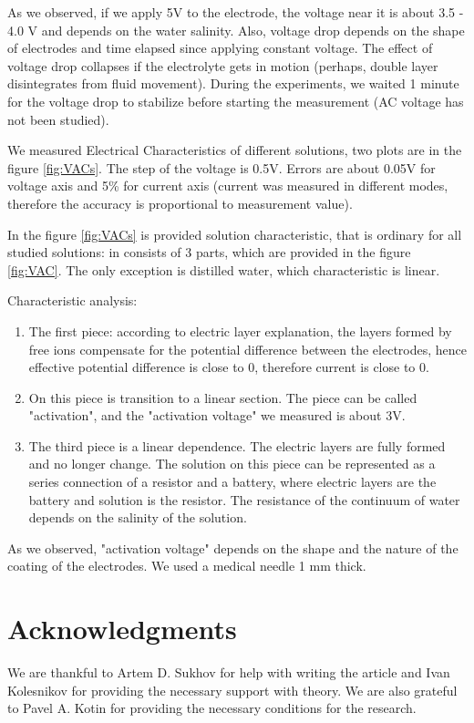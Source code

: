 \documentclass{article}
\begin{document}
As we observed, if we apply 5V to the electrode, the voltage near it is about 3.5 - 4.0 V and depends on the water salinity. Also, voltage drop depends on the shape of electrodes and time elapsed since applying constant voltage. The effect of voltage drop collapses if the electrolyte gets in motion (perhaps, double layer disintegrates from fluid movement). During the experiments, we waited 1 minute for the voltage drop to stabilize before starting the measurement (AC voltage has not been studied).\par

We measured Electrical Characteristics of different solutions, two plots are in the figure \ref{fig:VACs}. The step of the voltage is 0.5V. Errors are about 0.05V for voltage axis and 5\% for current axis (current was measured in different modes, therefore the accuracy is proportional to measurement value).


In the figure \ref{fig:VACs} is provided solution characteristic, that is ordinary for all studied solutions: in consists of 3 parts, which are provided in the figure \ref{fig:VAC}. The only exception is distilled water, which characteristic is linear.

Characteristic analysis:
\begin{enumerate}   
\item The first piece: according to electric layer explanation, the layers formed by free ions compensate for the potential difference between the electrodes, hence effective potential difference is close to 0, therefore current is close to 0.

\item On this piece is transition to a linear section. The piece can be called "activation", and the "activation voltage" we measured is about 3V.

\item The third piece is a linear dependence. The electric layers are fully formed and no longer change. The solution on this piece can be represented as a series connection of a resistor and a battery, where electric layers are the battery and solution is the resistor. The resistance of the continuum of water depends on the salinity of the solution.
\end{enumerate}

As we observed, "activation voltage" depends on the shape and the nature of the coating of the electrodes. We used a medical needle 1 mm thick.



\section{Acknowledgments}
We are thankful to Artem D. Sukhov for help with writing the article and Ivan Kolesnikov for providing the necessary support with theory. We are also grateful to Pavel A. Kotin for providing the necessary conditions for the research.



\end{document}
